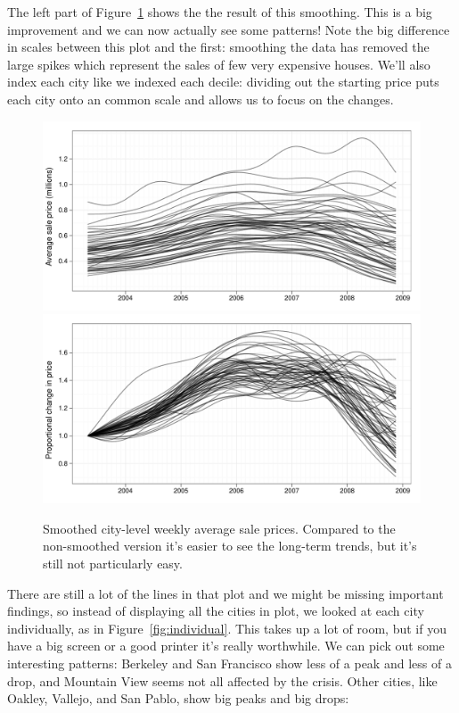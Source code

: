 \documentclass[oneside]{article}
\begin{document}
The left part of Figure~\ref{fig:smoothed} shows the the result of this smoothing. This is a big improvement and we can now actually see some patterns! Note the big difference in scales between this plot and the first: smoothing the data has removed the large spikes which represent the sales of few very expensive houses. We'll also index each city like we indexed each decile: dividing out the starting price puts each city onto an common scale and allows us to focus on the changes.

\begin{figure}[htbp]
  \centering
  \includegraphics[width=0.5 \linewidth]{cities-smooth}%
  \includegraphics[width=0.5 \linewidth]{cities-indexed}
  \caption{Smoothed city-level weekly average sale prices.  Compared to the non-smoothed version it's easier to see the long-term trends, but it's still not particularly easy.}
  \label{fig:smoothed}
\end{figure}

There are still a lot of the lines in that plot and we might be missing important findings, so instead of displaying all the cities in plot, we looked at each city individually, as in Figure~\ref{fig:individual}.  This takes up a lot of room, but if you have a big screen or a good printer it's really worthwhile.  We can pick out some interesting patterns: Berkeley and San Francisco show less of a peak and less of a drop, and Mountain View seems not all affected by the crisis.  Other cities, like Oakley, Vallejo, and San Pablo, show big peaks and big drops: 
\end{document}
